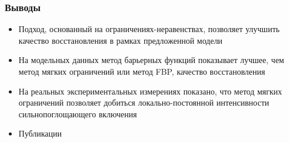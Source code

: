 \begin{frame}
\frametitle{Выводы}
\begin{itemize}
  \item Подход, основанный на ограничениях-неравенствах, позволяет улучшить качество восстановления в рамках предложенной модели
  \item На модельных данных метод барьерных функций показывает лучшее, чем метод мягких ограничений или метод FBP, качество восстановления
  \item На реальных экспериментальных измерениях показано, что метод мягких ограничений позволяет добиться локально-постоянной интенсивности сильнопоглощающего включения
  \item Публикации \cite{ecms2015Chukalina, icmv2015Chukalina,trudi_isa_2018}
\end{itemize}
\end{frame}